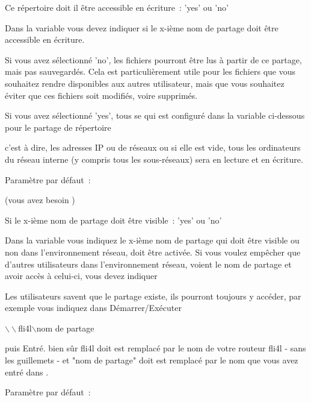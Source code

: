 \begin{description}

    Ce répertoire doit il être accessible en écriture~: 'yes' ou 'no'

        Dans la variable  vous devez indiquer si le
        x-ième nom de partage doit être accessible en écriture.

        Si vous avez sélectionné 'no', les fichiers pourront être lus à partir
        de ce partage, mais pas sauvegardés. Cela est particulièrement utile
        pour les fichiers que vous souhaitez rendre disponibles aux autres
        utilisateur, mais que vous souhaitez éviter que ces fichiers soit
        modifiés, voire supprimés.

        Si vous avez sélectionné 'yes', tous se qui est configuré dans la variable
        ci-dessous pour le partage de répertoire

        \var{SAMBA\_SHARE\_x\_NET]}

        c'est à dire, les adresses IP ou de réseaux ou si elle est vide, tous
        les ordinateurs du réseau interne (y compris tous les sous-réseaux)
        sera en lecture et en écriture.

        Paramètre par défaut~: 

\end{description}


\begin{description}
 (vous avez besoin )

    Si le x-ième nom de partage doit être visible~: 'yes' ou 'no'

        Dans la variable  vous indiquez le x-ième
        nom de partage qui doit être visible ou non dans l'environnement réseau,
         doit être activée.
        Si vous voulez empêcher que d'autres utilisateurs dans l'environnement
        réseau, voient le nom de partage et avoir accès à celui-ci, vous devez
        indiquer


        Les utilisateurs savent que le partage existe, ils pourront toujours
        y accéder, par exemple vous indiquez dans Démarrer/Exécuter

            $\backslash\backslash$fli4l$\backslash$nom de partage

        puis Entré. bien sûr \flqq{}fli4l\frqq{} doit est remplacé par le nom de
        votre routeur fli4l - sans les guillemets - et "nom de partage" doit est
        remplacé par le nom que vous avez entré dans .

        Paramètre par défaut~: 

\end{description}


